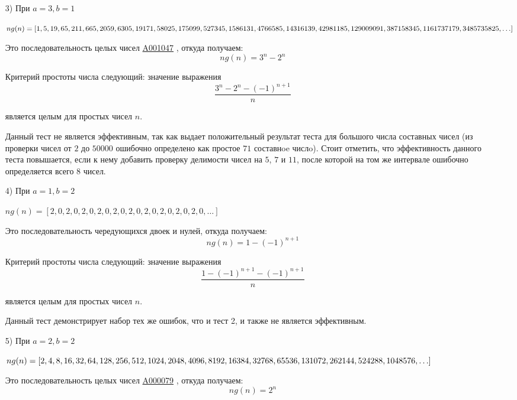 \documentclass[
russian,
cp1251,
14pt,
simple
]{eskdtext}
\theoremstyle{definition}
\begin{document}
\begin{itemize}
\item[3)] При $a = 3, b = 1$

\begin{math}
ng(n)=[1,5,19,65,211,665,2059,6305,19171,58025,175099,527345,\\
1586131,4766585, 14316139,42981185,129009091,387158345,1161737179,\\
3485735825,\ldots]
\end{math}

Это последовательность целых чисел \href{http://oeis.org/A001047}{A001047} \cite{oeis}, откуда получаем:
$$
ng(n)=3^n - 2^n
$$

Критерий простоты числа следующий: значение выражения
$$
\frac{3^n - 2^n - (-1)^{n + 1}}{n}
$$

является целым для простых чисел $n$.

Данный тест не является эффективным, так как выдает положительный результат теста для большого числа составных чисел (из проверки чисел от $2$ до $50000$ ошибочно определено как простое $71$ составнoe числo). Стоит отметить, что эффективность данного теста повышается, если к нему добавить проверку делимости чисел на $5$, $7$ и $11$, после которой на том же интервале ошибочно определяется всего $8$ чисел. 

\item[4)] При $a = 1, b = 2$

\begin{math}
ng(n)=[2,0,2,0,2,0,2,0,2,0,2,0,2,0,2,0,2,0,2,0,\ldots]
\end{math}

Это последовательность чередующихся двоек и нулей, откуда получаем:
$$
ng(n)=1 - (-1)^{n + 1}
$$

Критерий простоты числа следующий: значение выражения
$$
\frac{1 - (-1)^{n + 1} - (-1)^{n + 1}}{n}
$$

является целым для простых чисел $n$.

Данный тест демонстрирует набор тех же ошибок, что и тест 2, и также не является эффективным.

\item[5)] При $a=2, b=2$

\begin{math}
ng(n)=[2,4,8,16,32,64,128,256,512,1024,2048,4096,8192,16384,\\
32768,65536,131072,262144,524288,1048576,\ldots]
\end{math}

Это последовательность целых чисел \href{http://oeis.org/A000079}{A000079} \cite{oeis}, откуда получаем:
$$
ng(n)=2^n
$$


\end{itemize}
\end{document}
